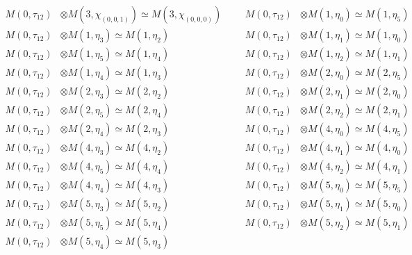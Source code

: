 \begin{align*}
M(0,\tau_{12}) &\otimes M(3,\chi_{(0,0,1)}) \simeq M(3,\chi_{(0,0,0)}) &&& M(0,\tau_{12}) &\otimes M(1,\eta_{0}) \simeq M(1,\eta_{5})\\
M(0,\tau_{12}) &\otimes M(1,\eta_{3}) \simeq M(1,\eta_{2}) &&& M(0,\tau_{12}) &\otimes M(1,\eta_{1}) \simeq M(1,\eta_{0})\\
M(0,\tau_{12}) &\otimes M(1,\eta_{5}) \simeq M(1,\eta_{4}) &&& M(0,\tau_{12}) &\otimes M(1,\eta_{2}) \simeq M(1,\eta_{1})\\
M(0,\tau_{12}) &\otimes M(1,\eta_{4}) \simeq M(1,\eta_{3}) &&& M(0,\tau_{12}) &\otimes M(2,\eta_{0}) \simeq M(2,\eta_{5})\\
M(0,\tau_{12}) &\otimes M(2,\eta_{3}) \simeq M(2,\eta_{2}) &&& M(0,\tau_{12}) &\otimes M(2,\eta_{1}) \simeq M(2,\eta_{0})\\
M(0,\tau_{12}) &\otimes M(2,\eta_{5}) \simeq M(2,\eta_{4}) &&& M(0,\tau_{12}) &\otimes M(2,\eta_{2}) \simeq M(2,\eta_{1})\\
M(0,\tau_{12}) &\otimes M(2,\eta_{4}) \simeq M(2,\eta_{3}) &&& M(0,\tau_{12}) &\otimes M(4,\eta_{0}) \simeq M(4,\eta_{5})\\
M(0,\tau_{12}) &\otimes M(4,\eta_{3}) \simeq M(4,\eta_{2}) &&& M(0,\tau_{12}) &\otimes M(4,\eta_{1}) \simeq M(4,\eta_{0})\\
M(0,\tau_{12}) &\otimes M(4,\eta_{5}) \simeq M(4,\eta_{4}) &&& M(0,\tau_{12}) &\otimes M(4,\eta_{2}) \simeq M(4,\eta_{1})\\
M(0,\tau_{12}) &\otimes M(4,\eta_{4}) \simeq M(4,\eta_{3}) &&& M(0,\tau_{12}) &\otimes M(5,\eta_{0}) \simeq M(5,\eta_{5})\\
M(0,\tau_{12}) &\otimes M(5,\eta_{3}) \simeq M(5,\eta_{2}) &&& M(0,\tau_{12}) &\otimes M(5,\eta_{1}) \simeq M(5,\eta_{0})\\
M(0,\tau_{12}) &\otimes M(5,\eta_{5}) \simeq M(5,\eta_{4}) &&& M(0,\tau_{12}) &\otimes M(5,\eta_{2}) \simeq M(5,\eta_{1})\\
M(0,\tau_{12}) &\otimes M(5,\eta_{4}) \simeq M(5,\eta_{3})
\end{align*}

